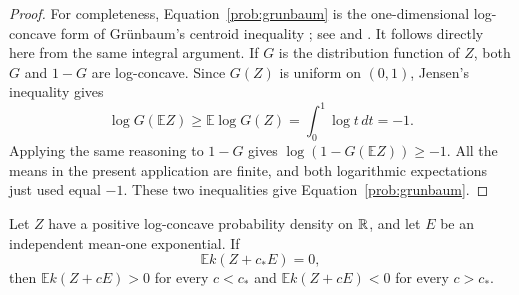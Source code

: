 \begin{proof}
For completeness, Equation~\eqref{prob:grunbaum} is the
one-dimensional log-concave form of Gr\"unbaum's centroid inequality
\cite{Grunbaum1960}; see \cite[Lemma~5.4]{LovaszVempala2007} and
\cite[Section~3]{MNRY18}. It follows directly here from the same integral
argument. If $G$ is the distribution function of $Z$, both $G$ and
$1-G$ are log-concave. Since $G(Z)$ is uniform on $(0,1)$, Jensen's
inequality gives
\[
 \log G(\mathbb EZ)\ge\mathbb E\log G(Z)
 =\int_0^1\log t\,dt=-1.
\]
Applying the same reasoning to $1-G$ gives
$\log(1-G(\mathbb EZ))\ge-1$. All the means in the present application
are finite, and both logarithmic expectations just used equal $-1$.
These two inequalities give Equation~\eqref{prob:grunbaum}.
\end{proof}

\begin{lemma}\label{prob:single-crossing}
Let $Z$ have a positive log-concave probability density on $\mathbb R$, and
let $E$ be an independent mean-one exponential. If
\[
 \mathbb E k(Z+c_*E)=0,
\]
then $\mathbb E k(Z+cE)>0$ for every $c<c_*$ and
$\mathbb E k(Z+cE)<0$ for every $c>c_*$.
\end{lemma}

